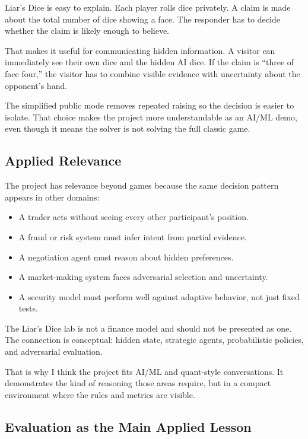 \documentclass[
]{article}
\providecommand{\tightlist}{%
  \setlength{\itemsep}{0pt}\setlength{\parskip}{0pt}}
\begin{document}
Liar's Dice is easy to explain. Each player rolls dice privately. A
claim is made about the total number of dice showing a face. The
responder has to decide whether the claim is likely enough to believe.

That makes it useful for communicating hidden information. A visitor can
immediately see their own dice and the hidden AI dice. If the claim is
``three of face four,'' the visitor has to combine visible evidence with
uncertainty about the opponent's hand.

The simplified public mode removes repeated raising so the decision is
easier to isolate. That choice makes the project more understandable as
an AI/ML demo, even though it means the solver is not solving the full
classic game.

\subsection{Applied Relevance}\label{applied-relevance}

The project has relevance beyond games because the same decision pattern
appears in other domains:

\begin{itemize}
\tightlist
\item
  A trader acts without seeing every other participant's position.
\item
  A fraud or risk system must infer intent from partial evidence.
\item
  A negotiation agent must reason about hidden preferences.
\item
  A market-making system faces adversarial selection and uncertainty.
\item
  A security model must perform well against adaptive behavior, not just
  fixed tests.
\end{itemize}

The Liar's Dice lab is not a finance model and should not be presented
as one. The connection is conceptual: hidden state, strategic agents,
probabilistic policies, and adversarial evaluation.

That is why I think the project fits AI/ML and quant-style
conversations. It demonstrates the kind of reasoning those areas
require, but in a compact environment where the rules and metrics are
visible.

\subsection{Evaluation as the Main Applied
Lesson}\label{evaluation-as-the-main-applied-lesson}
\end{document}
